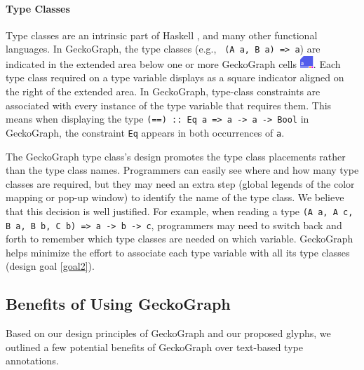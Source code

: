 \paragraph{Type Classes} 
Type classes are an intrinsic part of Haskell \cite{Hudak2007-kn}, and many other functional languages. In GeckoGraph, the type classes (e.g., \texttt{ (A a, B a) => a}) are indicated in the extended area below one or more GeckoGraph cells \includegraphics[height=1.2em]{figures/TypeClass.png}. Each type class required on a type variable displays as a square indicator aligned on the right of the extended area. In GeckoGraph, type-class constraints are associated with every instance of the type variable that requires them. This means when displaying the type \texttt{(==) :: Eq a => a -> a -> Bool} in GeckoGraph, the constraint \texttt{Eq} appears in both occurrences of \texttt{a}. 

The GeckoGraph type class's design promotes the type class placements rather than the type class names. Programmers can easily see where and how many type classes are required, but they may need an extra step (global legends of the color mapping or pop-up window) to identify the name of the type class. We believe that this decision is well justified. For example, when reading a type \texttt{(A a, A c, B a, B b, C b) => a -> b -> c}, programmers may need to switch back and forth to remember which type classes are needed on which variable. GeckoGraph helps minimize the effort to associate each type variable with all its type classes (design goal \ref{goal2}). 



\subsection{Benefits of Using GeckoGraph}\label{sec:benefits}
Based on our design principles of GeckoGraph and our proposed glyphs, we outlined a few potential benefits of GeckoGraph over text-based type annotations. 

